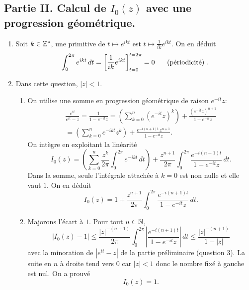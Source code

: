 \subsection*{Partie II. Calcul de $I_0(z)$ avec une progression géométrique.}
\begin{enumerate}
 \item Soit $k\in \mathbb{Z}^*$, une primitive de $t\mapsto e^{ikt}$ est $t\mapsto \frac{1}{ik}e^{ikt}$. On en déduit
\[
 \int_{0}^{2\pi}e^{ikt}\, dt = \left[ \frac{1}{ik}e^{ikt}\right]_{t = 0}^{t = 2\pi} = 0 \hspace{0.5cm}\text{ (périodicité) .} 
\]
 
 \item Dans cette question, $|z| < 1$.
\begin{enumerate}
 \item On utilise une somme en progression géométrique de raison $e^{-it}z$:
\begin{multline*}
 \frac{e^{it}}{e^{it} - z} = \frac{1}{1 - e^{-it}z}
 = \left( \sum_{k=0}^{n}(e^{-it}z)^k\right) + \frac{(e^{-it}z)^{n+1}}{1 - e^{-it}z}\\
 = \left( \sum_{k=0}^{n}e^{-ikt}z^k\right) + \frac{e^{-i(n+1)t}\,z^{n+1}}{1 - e^{-it}z} .
\end{multline*}
On intègre en exploitant la linéarité
\[
I_0(z) = \left( \sum_{k=0}^{n}\frac{z^k}{2\pi}\int_0^{2\pi}e^{-ikt}\,dt\right) +  \frac{z^{n+1}}{2\pi}\int_0^{2\pi}\frac{e^{-i(n+1)t}}{1 - e^{-it}z}\, dt.
\]
Dans la somme, seule l'intégrale attachée à $k=0$ est non nulle et elle vaut $1$. On en déduit
\[
I_0(z) = 1 +  \frac{z^{n+1}}{2\pi}\int_0^{2\pi}\frac{e^{-i(n+1)t}}{1 - e^{-it}z}\, dt .
\]

 \item Majorons l'écart à $1$. Pour tout $n\in \mathbb{N}$,
\[
 \left|I_0(z) - 1\right| \leq \frac{|z|^{-(n+1)}}{2\pi}\int_0^{2\pi}\left|\frac{e^{-i(n+1)t}}{1 - e^{-it}z}\right|\, dt
 \leq \frac{|z|^{-(n+1)}}{1 - |z|}
\]
avec la minoration de $|e^{it} - z|$ de la partie préliminaire (question 3). La suite en $n$ à droite tend vers $0$ car $|z|<1$ donc le nombre fixé à gauche est nul. On a prouvé
\[
 I_0(z) = 1.
\]

\end{enumerate}
 

\end{enumerate}
